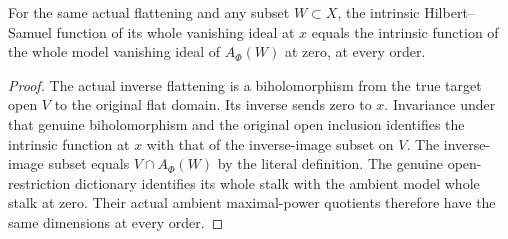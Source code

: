 \begin{theorem}
\label{hir:actual-fixed-flattening-original-intrinsic-hs-equality}
\leanok
For the same actual flattening and any subset $W\subset X$,
the intrinsic Hilbert--Samuel function of its whole vanishing
ideal at $x$ equals the intrinsic function of the whole model
vanishing ideal of $A_\Phi(W)$ at zero, at every order.
\end{theorem}
\begin{proof}
The actual inverse flattening is a biholomorphism from the true
target open $V$ to the original flat domain. Its inverse sends
zero to $x$. Invariance under that genuine biholomorphism and
the original open inclusion identifies the intrinsic function
at $x$ with that of the inverse-image subset on $V$. The
inverse-image subset equals $V\cap A_\Phi(W)$ by the literal
definition. The genuine open-restriction dictionary identifies
its whole stalk with the ambient model whole stalk at zero.
Their actual ambient maximal-power quotients therefore have
the same dimensions at every order.
\end{proof}

